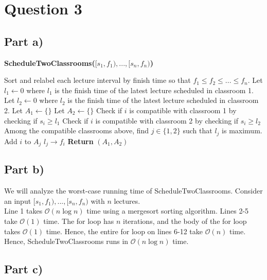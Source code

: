 \documentclass[12pt]{article}
\begin{document}
\newpage

\section*{Question 3}

\subsection*{Part a)}

\begin{algorithm}[hbt!]
\caption{\textbf{ScheduleTwoClassrooms($[s_1, f_1),...,[s_n,f_n)$)}}\label{alg:cap}

\begin{algorithmic}[1]
\State Sort and relabel each lecture interval by finish time so that $f_1 \leq f_2 \leq ... \leq f_n$.
\State Let $l_1 \gets 0$ where $l_1$ is the finish time of the latest lecture scheduled in classroom 1. 
\State Let $l_2 \gets 0$ where $l_2$ is the finish time of the latest lecture scheduled in classroom 2.
\State Let $A_1 \gets \{\}$
\State Let $A_2 \gets \{\}$
    \State Check if $i$ is compatible with classroom 1 by checking if $s_i \geq l_1$  
    \State Check if $i$ is compatible with classroom 2 by checking if $s_i \geq l_2$
    \State Among the compatible classrooms above, find $j \in \{1,2\}$ such that $l_j$ is maximum. 
    \State Add $i$ to $A_j$
    \State $l_j \rightarrow f_i$
\EndFor
\State \textbf{Return} $(A_1,A_2)$
\end{algorithmic}
\end{algorithm}

\subsection*{Part b)}

We will analyze the worst-case running time of ScheduleTwoClassrooms. Consider an input $[s_1, f_1),...,[s_n,f_n)$ with $n$ lectures. \\

Line 1 takes $\mathcal{O}(n\log n)$ time using a mergesort sorting algorithm. Lines 2-5 take $\mathcal{O}(1)$ time. The for loop has $n$ iterations, and the body of the for loop takes $\mathcal{O}(1)$ time. Hence, the entire for loop on lines 6-12 take $\mathcal{O}(n)$ time. \\

Hence, ScheduleTwoClassrooms runs in $\mathcal{O}(n\log n)$ time. 

\subsection*{Part c)}
\end{document}
